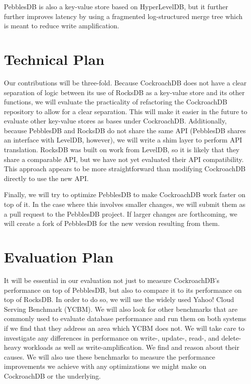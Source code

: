 \documentclass[10pt,twocolumn,letterpaper]{article}
\begin{document}
PebblesDB is also a key-value store based on HyperLevelDB, but it further
further improves latency by using a fragmented log-structured merge tree which
is meant to reduce write amplification.


\section{Technical Plan}
Our contributions will be three-fold. Because CockroachDB does not have a clear
separation of logic between its use of RocksDB as a key-value store and its
other functions, we will evaluate the practicality of refactoring the
CockroachDB repository to allow for a clear separation. This will make it
easier in the future to evaluate other key-value stores as bases under
CockroachDB. Additionally, because PebblesDB and RocksDB do not share the same
API (PebblesDB shares an interface with LevelDB, however), we will write a shim
layer to perform API translation. RocksDB was built on work from LevelDB, so it
is likely that they share a comparable API, but we have not yet evaluated their
API compatibility. This approach appears to be more straightforward than
modifying CockroachDB directly to use the new API.

Finally, we will try to optimize PebblesDB to make CockroachDB work faster on
top of it. In the case where this involves smaller changes, we will submit them
as a pull request to the PebblesDB project. If larger changes are forthcoming,
we will create a fork of PebblesDB for the new version resulting from them.


\section{Evaluation Plan}
It will be essential in our evaluation not just to measure CockroachDB's
performance on top of PebblesDB, but also to compare it to its performance on
top of RocksDB. In order to do so, we will use the widely used Yahoo! Cloud
Serving Benchmark (YCBM). We will also look for other benchmarks that are
commonly used to evaluate database performance and run them on both systems if
we find that they address an area which YCBM does not. We will take care to
investigate any differences in performance on write-, update-, read-, and
delete-heavy workloads as well as write-amplification. We find and reason about
their causes. We will also use these benchmarks to measure the performance
improvements we achieve with any optimizations we might make on CockroachDB or
the underlying.
\end{document}
